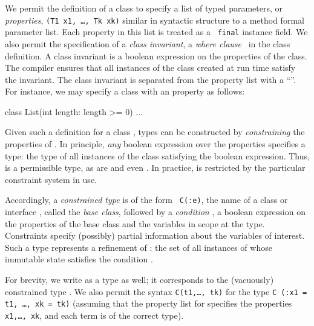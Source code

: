 We permit the definition of a class  to specify
a list of typed parameters, or {\em properties},
{\tt (T1 x1, \ldots, Tk xk)} similar in syntactic structure to
a method formal parameter list.
%
Each property in this list is treated as  a  {\tt
final} instance field.
%
We also permit the
specification of a {\em class invariant}, a
{\em where clause}~\cite{where-clauses}
in the class definition. A class invariant
is a boolean expression on the properties of the class.
The compiler ensures that all
instances of the class created at run time satisfy the
invariant.
%
The class invariant is separated from the
property list with a ``\xcd{:}''. 
%
For instance, we may specify a class  with an
 property as follows:
\begin{displayxten}
    class List(int length: length >= 0) {...}
\end{displayxten}
Given such a definition for a class , types can be
constructed by {\em constraining} the properties of .  In
principle, {\em any} boolean expression over the properties
specifies a type: the type of all instances of the class
satisfying the boolean expression. Thus, 
is a permissible type, as are  and
even .
In practice,  is restricted by the particular constraint
system in use.

Accordingly, a {\em constrained type} is of the form {\tt
C(:e)}, the name of a class or interface , called the
{\em base class}, followed by a {\em condition} ,
a boolean expression on the properties of the
base class and the  variables in scope at the type.
Constraints specify (possibly) partial information about the
variables of interest.
Such a type represents a refinement of : the set of all
instances of  whose immutable state satisfies the
condition
.

For brevity, we write  as a type as well; it
corresponds to the (vacuously) constrained type .
We also permit the syntax {\tt C(t1,\ldots, tk)} for
the type {\tt C (:x1 = t1, \ldots, xk = tk)} (assuming that
the property list for  specifies the  properties
{\tt
x1,\ldots, xk}, and each term  is of the correct
type).

